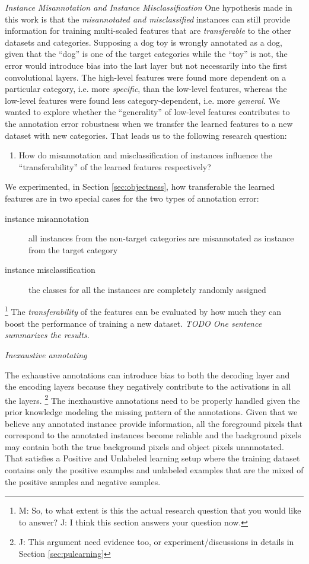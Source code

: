 \noindent
\textit{Instance Misannotation and Instance Misclassification}
\noindent
One hypothesis made in this work is that the \textit{misannotated and misclassified} instances can still provide information for training multi-scaled features that are \textit{transferable}\cite{yosinski2014transferable} to the other datasets and categories.
Supposing a dog toy is wrongly annotated as a dog, given that the ``dog'' is one of the target categories while the ``toy'' is not, the error would introduce bias into the last layer but not necessarily into the first convolutional layers.
The high-level features were found more dependent on a particular category, i.e. more \textit{specific}, than the low-level features, whereas the low-level features were found less category-dependent, i.e. more \textit{general}. \cite{yosinski2014transferable}
We wanted to explore whether the ``generality'' of low-level features contributes to the annotation error robustness when we transfer the learned features to a new dataset with new categories.
That leads us to the following research question:
\begin{enumerate}
  \item How do misannotation and misclassification of instances influence the ``transferability'' of the learned features respectively?
\end{enumerate}
We experimented, in Section \ref{sec:objectness}, how transferable the learned features are in two special cases for the two types of annotation error:
\begin{description}
  \item [instance misannotation] all instances from the non-target categories are misannotated as instance from the target category
  \item [instance misclassification] the classes for all the instances are completely randomly assigned
\end{description}
\footnote{M: So, to what extent is this the actual research question that you would like to answer? J: I think this section answers your question now.}
The \textit{transferability} of the features can be evaluated by how much they can boost the performance of training a new dataset. \cite{yosinski2014transferable}
\textit{TODO One sentence summarizes the results.}

\noindent
\textit{Inexaustive annotating}

\noindent
The exhaustive annotations can introduce bias to both the decoding layer and the encoding layers because they negatively contribute to the activations in all the layers.
\footnote{J: This argument need evidence too, or experiment/discussions in details in Section \ref{sec:pulearning}}
The inexhaustive annotations need to be properly handled given the prior knowledge modeling the missing pattern of the annotations.
Given that we believe any annotated instance provide information, all the foreground pixels that correspond to the annotated instances become reliable and the background pixels may contain both the true background pixels and object pixels unannotated.
That satisfies a Positive and Unlabeled learning setup where the training dataset contains only the positive examples and unlabeled examples that are the mixed of the positive samples and negative samples.
